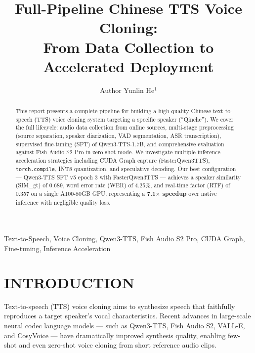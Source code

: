 \documentclass{ar-1col}
\begin{document}
\title{Full-Pipeline Chinese TTS Voice Cloning: \\ From Data Collection to Accelerated Deployment}

\author{Author Yunlin He$^1$
}

\begin{abstract}
This report presents a complete pipeline for building a high-quality Chinese text-to-speech (TTS) voice cloning system targeting a specific speaker (``Qinche''). We cover the full lifecycle: audio data collection from online sources, multi-stage preprocessing (source separation, speaker diarization, VAD segmentation, ASR transcription), supervised fine-tuning (SFT) of Qwen3-TTS-1.7B, and comprehensive evaluation against Fish Audio S2 Pro in zero-shot mode. We investigate multiple inference acceleration strategies including CUDA Graph capture (FasterQwen3TTS), \texttt{torch.compile}, INT8 quantization, and speculative decoding. Our best configuration --- Qwen3-TTS SFT v5 epoch 3 with FasterQwen3TTS --- achieves a speaker similarity (SIM\_gt) of 0.689, word error rate (WER) of 4.25\%, and real-time factor (RTF) of 0.357 on a single A100-80GB GPU, representing a \textbf{7.1$\times$ speedup} over native inference with negligible quality loss.
\end{abstract}

\begin{keywords}
Text-to-Speech, Voice Cloning, Qwen3-TTS, Fish Audio S2 Pro, CUDA Graph, Fine-tuning, Inference Acceleration
\end{keywords}

\maketitle
\tableofcontents

\section{INTRODUCTION}

Text-to-speech (TTS) voice cloning aims to synthesize speech that faithfully reproduces a target speaker's vocal characteristics. Recent advances in large-scale neural codec language models --- such as Qwen3-TTS, Fish Audio S2, VALL-E, and CosyVoice --- have dramatically improved synthesis quality, enabling few-shot and even zero-shot voice cloning from short reference audio clips.
\end{document}
